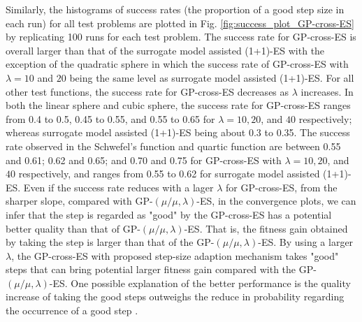 Similarly, the histograms of success rates (the proportion of a good step size in each run) for all test problems are plotted in Fig. \ref{fig:success_plot_GP-cross-ES} by replicating 100 runs for each test problem. The success rate for GP-cross-ES is overall larger than that of the surrogate model assisted (1+1)-ES with the exception of the quadratic sphere in which the success rate of GP-cross-ES with $\lambda=10$ and $20$ being the same level as surrogate model assisted (1+1)-ES. For all other test functions, the success rate for GP-cross-ES decreases as $\lambda$ increases. In both the linear sphere and cubic sphere, the success rate for GP-cross-ES ranges from 0.4 to 0.5, 0.45 to 0.55, and 0.55 to 0.65 for $\lambda=10,20$, and $40$ respectively; whereas surrogate model assisted (1+1)-ES being about 0.3 to 0.35. The success rate observed in the Schwefel's function and quartic function are between 0.55 and 0.61; 0.62 and 0.65; and 0.70 and 0.75 for GP-cross-ES with $\lambda=10,20$, and $40$ respectively, and ranges from 0.55 to 0.62 for surrogate model assisted (1+1)-ES. Even if the success rate reduces with a lager $\lambda$ for GP-cross-ES, from the sharper slope, compared with GP-$(\mu/\mu,\lambda)$-ES, in the convergence plots, we can infer that the step is regarded as "good" by the GP-cross-ES has a potential better quality than that of GP-$(\mu/\mu,\lambda)$-ES. That is, the fitness gain obtained by taking the step is larger than that of the GP-$(\mu/\mu,\lambda)$-ES. By using a larger $\lambda$, the GP-cross-ES with proposed step-size adaption mechanism takes "good" steps that can bring potential larger fitness gain compared with the GP-$(\mu/\mu,\lambda)$-ES. One possible explanation of the better performance is the quality increase of taking the good steps outweighs the reduce in probability regarding the occurrence of a good step .  





